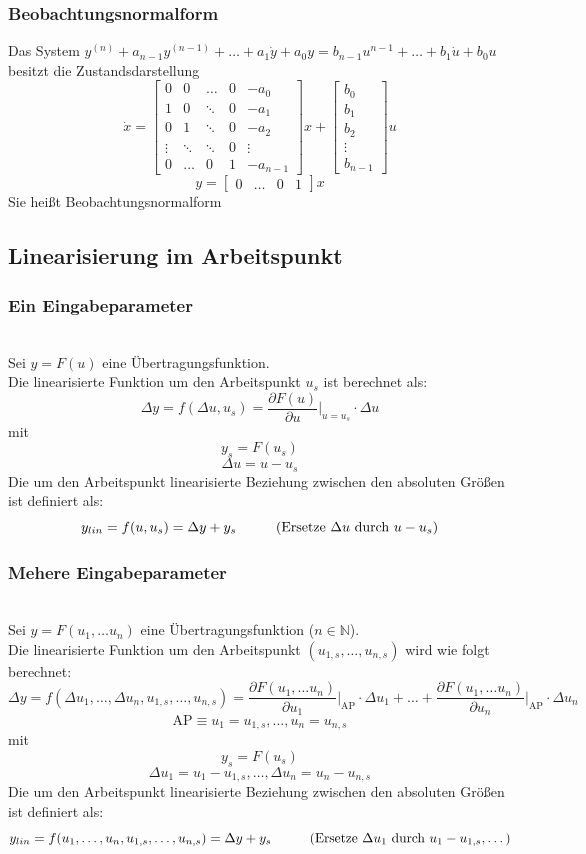 \documentclass[10pt,a4paper]{article}
\newcommand{\tab}[1][1]{\hspace*{#1cm}}
\newcommand{\vect}[1]{\ensuremath{\begin{bmatrix}#1\end{bmatrix}}}
\begin{document}
\subsubsection{Beobachtungsnormalform}
Das System $y^{(n)} + a_{n-1} y^{(n-1)} + \dots + a_1 \dot y + a_0 y = b_{n-1} u^{n-1} + \dots + b_1 \dot u + b_0 u$ \\
besitzt die Zustandsdarstellung
$$
\dot x = \begin{bmatrix}
0 & 0 & \dots & 0 & -a_0 \\
1 & 0 & \ddots & 0 & -a_1 \\
0 & 1 & \ddots & 0 & -a_2\\
\vdots & \ddots & \ddots & 0 & \vdots \\
0 & \dots & 0 & 1 & -a_{n-1}
\end{bmatrix} x + \vect{b_0 \\ b_1 \\ b_2 \\ \vdots \\ b_{n-1}} u
$$
$$
y = \vect{0 & \dots & 0 & 1} x
$$
Sie heißt Beobachtungsnormalform


\subsection{Linearisierung im Arbeitspunkt}
\subsubsection{Ein Eingabeparameter} ~\\
Sei $y = F(u)$ eine Übertragungsfunktion. \\
Die linearisierte Funktion um den Arbeitspunkt $u_s$ ist berechnet als:
$$
	\Delta y = f(\Delta u, u_s) = \frac{\partial F(u)}{\partial u}\bigg|_{u = u_s} ⋅ \Delta u
$$
mit
$$
	y_s = F(u_s)
$$
$$
	\Delta u = u - u_s
$$
Die um den Arbeitspunkt linearisierte Beziehung zwischen den absoluten Größen ist definiert als:
$$
	y_{lin} = f(u,u_s) = \Delta y + y_s \tab \text{(Ersetze $\Delta u$ durch $u - u_s$)}
$$

\subsubsection{Mehere Eingabeparameter} ~\\
Sei $y = F(u_1, \dots u_n)$ eine Übertragungsfunktion ($n \in \mathbb{N}$). \\
Die linearisierte Funktion um den Arbeitspunkt $(u_{1,s}, \dots, u_{n,s})$ wird wie folgt berechnet:
$$
\Delta y = f(\Delta u_1, \dots, \Delta u_n, u_{1,s}, \dots, u_{n,s}) = \frac{\partial F(u_1, \dots u_n)}{\partial u_1}\Bigg|_\textrm{AP} ⋅ \Delta u_1 + \dots + \frac{\partial F(u_1, \dots u_n)}{\partial u_n}\Bigg|_\textrm{AP} ⋅ \Delta u_n
$$
$$
	\textrm{AP} ≡ u_1 = u_{1,s}, \dots, u_n = u_{n,s}
$$
mit
$$
	y_s = F(u_s)
$$
$$
	\Delta u_1 = u_1 - u_{1,s}, \dots, \Delta u_n = u_n - u_{n,s}
$$
Die um den Arbeitspunkt linearisierte Beziehung zwischen den absoluten Größen ist definiert als:
$$
y_{lin} = f(u_1, \dots, u_n, u_{1,s}, \dots, u_{n,s}) = \Delta y + y_s  \tab \text{(Ersetze $\Delta u_1$ durch $u_1 - u_{1,s}, \dots$)}
$$
\end{document}
